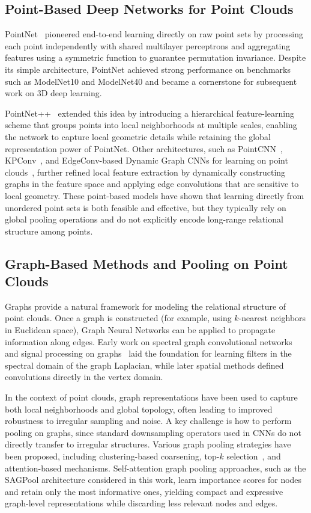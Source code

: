 \documentclass[conference]{IEEEtran}
\begin{document}
\subsection{Point-Based Deep Networks for Point Clouds}

PointNet~\cite{b1} pioneered end-to-end learning directly on raw point sets by
processing each point independently with shared multilayer perceptrons and
aggregating features using a symmetric function to guarantee permutation
invariance. Despite its simple architecture, PointNet achieved strong
performance on benchmarks such as ModelNet10 and ModelNet40 and became a
cornerstone for subsequent work on 3D deep learning.

PointNet++~\cite{b3} extended this idea by introducing a hierarchical
feature-learning scheme that groups points into local neighborhoods at multiple
scales, enabling the network to capture local geometric details while retaining
the global representation power of PointNet. Other architectures, such as PointCNN~\cite{b11}, KPConv~\cite{b12}, and
EdgeConv-based Dynamic Graph CNNs for learning on point clouds~\cite{b4}, further
refined local feature extraction by dynamically constructing graphs in the
feature space and applying edge convolutions that are sensitive to local
geometry. These point-based models have shown that learning directly from
unordered point sets is both feasible and effective, but they typically rely on
global pooling operations and do not explicitly encode long-range relational
structure among points.

\subsection{Graph-Based Methods and Pooling on Point Clouds}

Graphs provide a natural framework for modeling the relational structure of
point clouds. Once a graph is constructed (for example, using $k$-nearest
neighbors in Euclidean space), Graph Neural Networks can be applied to propagate
information along edges. Early work on spectral graph convolutional
networks and signal processing on graphs~\cite{b5,b6,b7,b8} laid the foundation for learning filters in the
spectral domain of the graph Laplacian, while later spatial methods defined
convolutions directly in the vertex domain.

In the context of point clouds, graph representations have been used to capture
both local neighborhoods and global topology, often leading to improved
robustness to irregular sampling and noise. A key challenge is how to perform
pooling on graphs, since standard downsampling operators used in CNNs do not
directly transfer to irregular structures. Various graph pooling strategies
have been proposed, including clustering-based coarsening, top-$k$ selection~\cite{b10},
and attention-based mechanisms. Self-attention graph pooling approaches, such
as the SAGPool architecture considered in this work, learn importance scores
for nodes and retain only the most informative ones, yielding compact and
expressive graph-level representations while discarding less relevant nodes and
edges.
\end{document}
